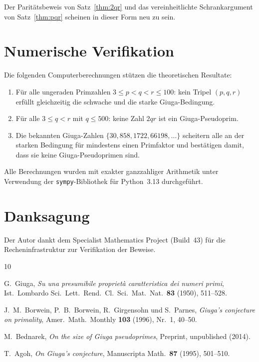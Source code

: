 \documentclass[12pt,a4paper]{amsart}
\theoremstyle{definition}
\begin{document}
Der Paritätsbeweis von Satz~\ref{thm:2qr} und das vereinheitlichte
Schrankargument von Satz~\ref{thm:pqr} scheinen in dieser Form neu zu sein.

\section{Numerische Verifikation}

Die folgenden Computerberechnungen stützen die theoretischen Resultate:

\begin{enumerate}
  \item Für alle ungeraden Primzahlen $3 \le p < q < r \le 100$: kein Tripel $(p, q, r)$
        erfüllt gleichzeitig die schwache und die starke Giuga-Bedingung.
  \item Für alle $3 \le q < r$ mit $q \le 500$: keine Zahl $2qr$ ist ein
        Giuga-Pseudoprim.
  \item Die bekannten Giuga-Zahlen $\{30, 858, 1722, 66198, \ldots\}$ scheitern
        alle an der starken Bedingung für mindestens einen Primfaktor und bestätigen
        damit, dass sie keine Giuga-Pseudoprimen sind.
\end{enumerate}

Alle Berechnungen wurden mit exakter ganzzahliger Arithmetik unter Verwendung der
\texttt{sympy}-Bibliothek für Python~3.13 durchgeführt.

\section*{Danksagung}

Der Autor dankt dem Specialist Mathematics Project (Build~43) für die
Recheninfrastruktur zur Verifikation der Beweise.

\begin{thebibliography}{10}

G.~Giuga,
\emph{Su una presumibile propriet\`a caratteristica dei numeri primi},
Ist.\ Lombardo Sci.\ Lett.\ Rend.\ Cl.\ Sci.\ Mat.\ Nat.\ \textbf{83}
(1950), 511--528.

J.~M.~Borwein, P.~B.~Borwein, R.~Girgensohn und S.~Parnes,
\emph{Giuga's conjecture on primality},
Amer.\ Math.\ Monthly \textbf{103} (1996), Nr.\ 1, 40--50.

M.~Bednarek,
\emph{On the size of Giuga pseudoprimes},
Preprint, unpublished (2014).

T.~Agoh,
\emph{On Giuga's conjecture},
Manuscripta Math.\ \textbf{87} (1995), 501--510.

\end{thebibliography}
\end{document}
